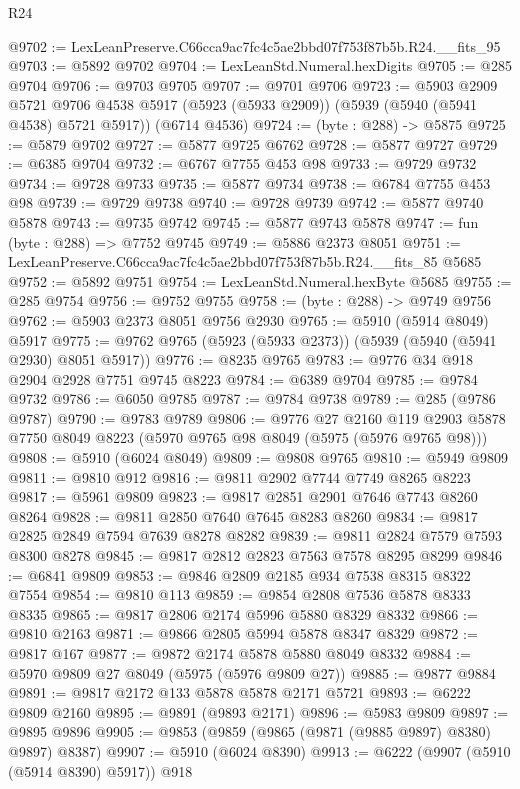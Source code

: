 \begin{lexlean}{R24}
\begin{coremodule}
@9702 := LexLeanPreserve.C66cca9ac7fc4c5ae2bbd07f753f87b5b.R24.__fits_95
@9703 := @5892 @9702
@9704 := LexLeanStd.Numeral.hexDigits
@9705 := @285 @9704
@9706 := @9703 @9705
@9707 := @9701 @9706
@9723 := @5903
    @2909
    @5721
    @9706
    @4538
    @5917
    (@5923 (@5933 @2909))
    (@5939 (@5940 (@5941 @4538) @5721 @5917))
    (@6714 @4536)
@9724 := (byte : @288) -> @5875
@9725 := @5879 @9702
@9727 := @5877 @9725 @6762
@9728 := @5877 @9727
@9729 := @6385 @9704
@9732 := @6767 @7755 @453 @98
@9733 := @9729 @9732
@9734 := @9728 @9733
@9735 := @5877 @9734
@9738 := @6784 @7755 @453 @98
@9739 := @9729 @9738
@9740 := @9728 @9739
@9742 := @5877 @9740 @5878
@9743 := @9735 @9742
@9745 := @5877 @9743 @5878
@9747 := fun (byte : @288) => @7752 @9745
@9749 := @5886 @2373 @8051
@9751 := LexLeanPreserve.C66cca9ac7fc4c5ae2bbd07f753f87b5b.R24.__fits_85 @5685
@9752 := @5892 @9751
@9754 := LexLeanStd.Numeral.hexByte @5685
@9755 := @285 @9754
@9756 := @9752 @9755
@9758 := (byte : @288) -> @9749 @9756
@9762 := @5903 @2373 @8051 @9756 @2930
@9765 := @5910 (@5914 @8049) @5917
@9775 := @9762 @9765 (@5923 (@5933 @2373)) (@5939 (@5940 (@5941 @2930) @8051 @5917))
@9776 := @8235 @9765
@9783 := @9776 @34 @918 @2904 @2928 @7751 @9745 @8223
@9784 := @6389 @9704
@9785 := @9784 @9732
@9786 := @6050 @9785
@9787 := @9784 @9738
@9789 := @285 (@9786 @9787)
@9790 := @9783 @9789
@9806 := @9776
    @27
    @2160
    @119
    @2903
    @5878
    @7750
    @8049
    @8223
    (@5970 @9765 @98 @8049 (@5975 (@5976 @9765 @98)))
@9808 := @5910 (@6024 @8049)
@9809 := @9808 @9765
@9810 := @5949 @9809
@9811 := @9810 @912
@9816 := @9811 @2902 @7744 @7749 @8265 @8223
@9817 := @5961 @9809
@9823 := @9817 @2851 @2901 @7646 @7743 @8260 @8264
@9828 := @9811 @2850 @7640 @7645 @8283 @8260
@9834 := @9817 @2825 @2849 @7594 @7639 @8278 @8282
@9839 := @9811 @2824 @7579 @7593 @8300 @8278
@9845 := @9817 @2812 @2823 @7563 @7578 @8295 @8299
@9846 := @6841 @9809
@9853 := @9846 @2809 @2185 @934 @7538 @8315 @8322 @7554
@9854 := @9810 @113
@9859 := @9854 @2808 @7536 @5878 @8333 @8335
@9865 := @9817 @2806 @2174 @5996 @5880 @8329 @8332
@9866 := @9810 @2163
@9871 := @9866 @2805 @5994 @5878 @8347 @8329
@9872 := @9817 @167
@9877 := @9872 @2174 @5878 @5880 @8049 @8332
@9884 := @5970 @9809 @27 @8049 (@5975 (@5976 @9809 @27))
@9885 := @9877 @9884
@9891 := @9817 @2172 @133 @5878 @5878 @2171 @5721
@9893 := @6222 @9809 @2160
@9895 := @9891 (@9893 @2171)
@9896 := @5983 @9809
@9897 := @9895 @9896
@9905 := @9853 (@9859 (@9865 (@9871 (@9885 @9897) @8380) @9897) @8387)
@9907 := @5910 (@6024 @8390)
@9913 := @6222 (@9907 (@5910 (@5914 @8390) @5917)) @918

\end{coremodule}
\end{lexlean}
